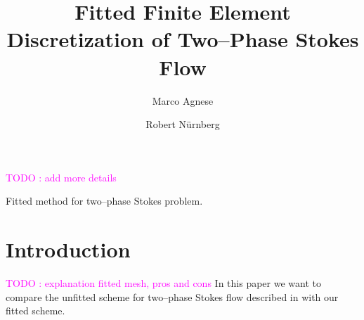 \documentclass[a4paper,12pt,onecolumn]{article}
\title{Fitted Finite Element Discretization of Two--Phase Stokes Flow}
\author{Marco Agnese \and Robert N\"urnberg}
\begin{document}
\maketitle

\begin{abstract}

\end{abstract}

\textcolor{magenta}{TODO : add more details}

Fitted method for two--phase Stokes problem. 

\section{Introduction}\label{sec:introduction}
\textcolor{magenta}{TODO : explanation fitted mesh, pros and cons}
In this paper we want to compare the unfitted scheme for two--phase Stokes flow described in \cite{spurious} with our fitted scheme.  
\end{document}
